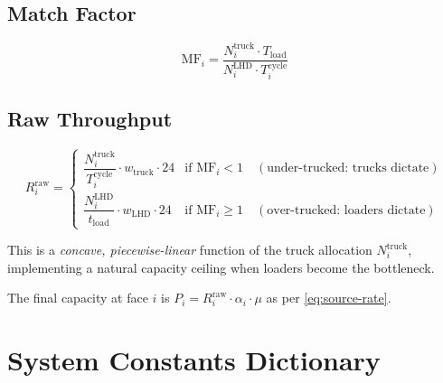 \documentclass[11pt,a4paper]{article}
\theoremstyle{definition}
\begin{document}
\subsection{Match Factor}

\begin{equation}
  \text{MF}_i = \frac{N_i^{\text{truck}} \cdot T_{\text{load}}}{N_i^{\text{LHD}} \cdot T_i^{\text{cycle}}}
  \label{eq:match-factor}
\end{equation}

\subsection{Raw Throughput}

\begin{equation}
  R_i^{\text{raw}} =
    \begin{cases}
      \dfrac{N_i^{\text{truck}}}{T_i^{\text{cycle}}} \cdot w_{\text{truck}} \cdot 24
        & \text{if } \text{MF}_i < 1 \quad (\text{under-trucked: trucks dictate}) \\[10pt]
      \dfrac{N_i^{\text{LHD}}}{t_{\text{load}}} \cdot w_{\text{LHD}} \cdot 24
        & \text{if } \text{MF}_i \geq 1 \quad (\text{over-trucked: loaders dictate})
    \end{cases}
  \label{eq:raw-throughput}
\end{equation}

This is a \emph{concave, piecewise-linear} function of the truck allocation
$N_i^{\text{truck}}$, implementing a natural capacity ceiling when loaders
become the bottleneck.

The final capacity at face $i$ is $P_i = R_i^{\text{raw}} \cdot \alpha_i \cdot \mu$
as per \cref{eq:source-rate}.


\section{System Constants Dictionary}
\label{sec:constants}
\end{document}
